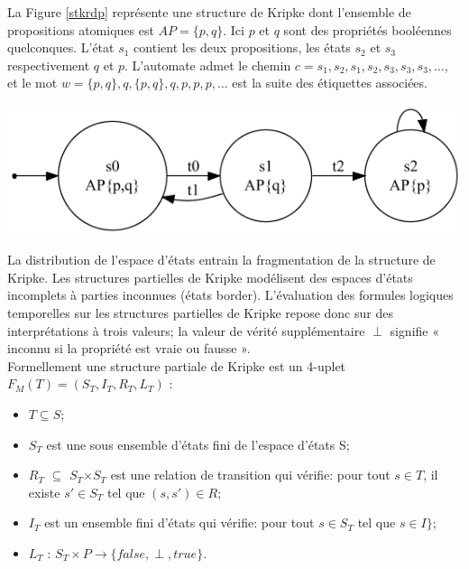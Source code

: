 La Figure \ref{stkrdp} représente une structure de Kripke dont l'ensemble de propositions atomiques est ${\displaystyle AP=\{p,q\}}$. Ici ${\displaystyle p}$   et ${\displaystyle q}$  sont des propriétés booléennes quelconques. L'état \emph{$s_1$} contient les deux propositions, les états \emph{$s_2$} et \emph{$s_3$} respectivement ${\displaystyle q}$  et ${\displaystyle p}$. L'automate admet le chemin ${\displaystyle c=s_1,s_2,s_1,s_2,s_3,s_3,s_3,\ldots }$, et le mot ${\displaystyle w=\{p,q\},q,\{p,q\},q,p,p,p,\ldots }$ est la suite des étiquettes associées.

\begin{center}
	\includegraphics[scale=0.4]{img/stk.png}
	 \label{stkrdp}
 \end{center}
 
 
La distribution de l'espace d'états entrain la fragmentation de la structure de Kripke. Les structures partielles de Kripke modélisent des espaces d'états incomplets à parties inconnues (états border). L'évaluation des formules logiques temporelles sur les structures partielles de Kripke repose donc sur des interprétations à trois valeurs; la valeur de vérité supplémentaire \textbf{$\perp$ }  signifie « inconnu si la propriété est vraie ou fausse ».\\
Formellement une structure partiale de Kripke est un 4-uplet \\${\displaystyle F_M(T) = (S_T , I_T , R_T , L_T )}$ \citep{depriester2011bouneb}:
\begin{itemize}
	\item $T \subseteq S $;
	\item \textbf{$S_T$}  est une sous ensemble d'états fini de l'espace d'états S;
	\item \textbf{$R_T$} $\subseteq$ \textbf{$S_T$}$\times$\textbf{$S_T$}  est une relation de transition qui vérifie: pour tout ${\displaystyle s\in T}$, il existe ${\displaystyle s'\in S_T} $ tel que ${\displaystyle (s,s')\in R}$;
	\item $I_T$ est un ensemble fini d'états qui vérifie: pour tout $ s \in S_T $ tel que $ s \in I \}$;
	\item $ L_T$ : $S_T \times P \rightarrow \{ false, \perp , true \} $.
\end{itemize}

